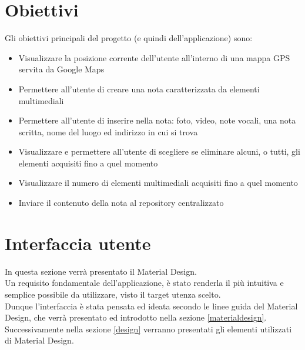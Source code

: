 \section{Obiettivi}

Gli obiettivi principali del progetto (e quindi dell'applicazione) sono:
\begin{itemize}
\item Visualizzare la posizione corrente dell'utente all'interno di una mappa GPS servita da Google Maps
\item Permettere all'utente di creare una nota caratterizzata da elementi multimediali
\item Permettere all'utente di inserire nella nota: foto, video, note vocali, una nota scritta, nome del luogo ed indirizzo in cui si trova
\item Visualizzare e permettere all'utente di scegliere se eliminare alcuni, o tutti, gli elementi acquisiti fino a quel momento
\item Visualizzare il numero di elementi multimediali acquisiti fino a quel momento
\item Inviare il contenuto della nota al repository centralizzato
\end{itemize}

\section{Interfaccia utente}
In questa sezione verrà presentato il Material Design.
\\Un requisito fondamentale dell'applicazione, è stato renderla il più intuitiva e semplice possibile da utilizzare, visto il target utenza scelto.
\\Dunque l'interfaccia è stata pensata ed ideata secondo le linee guida del Material Design, che verrà presentato ed introdotto nella sezione \ref{materialdesign}.
\\Successivamente nella sezione \ref{design} verranno presentati gli elementi utilizzati di Material Design.

